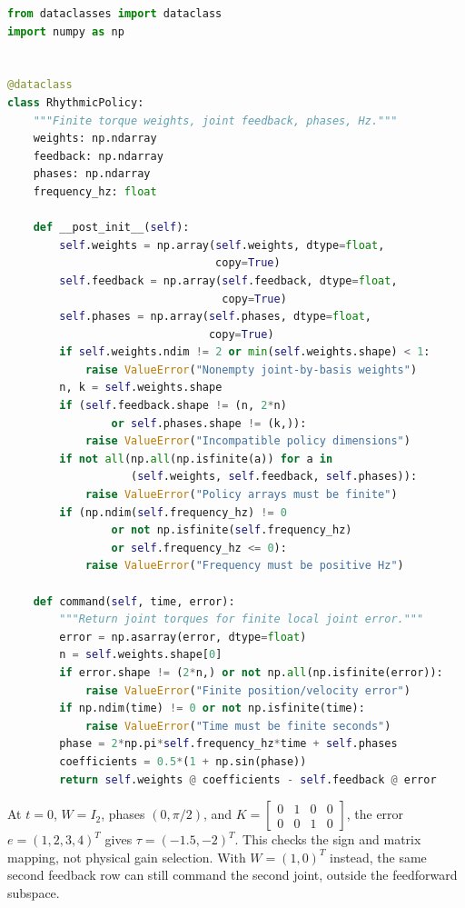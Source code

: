 \begin{lstlisting}[language=Python, caption={A Supplied Rhythmic Policy, Without a Plant}]
from dataclasses import dataclass
import numpy as np


@dataclass
class RhythmicPolicy:
    """Finite torque weights, joint feedback, phases, Hz."""
    weights: np.ndarray
    feedback: np.ndarray
    phases: np.ndarray
    frequency_hz: float

    def __post_init__(self):
        self.weights = np.array(self.weights, dtype=float,
                                copy=True)
        self.feedback = np.array(self.feedback, dtype=float,
                                 copy=True)
        self.phases = np.array(self.phases, dtype=float,
                               copy=True)
        if self.weights.ndim != 2 or min(self.weights.shape) < 1:
            raise ValueError("Nonempty joint-by-basis weights")
        n, k = self.weights.shape
        if (self.feedback.shape != (n, 2*n)
                or self.phases.shape != (k,)):
            raise ValueError("Incompatible policy dimensions")
        if not all(np.all(np.isfinite(a)) for a in
                   (self.weights, self.feedback, self.phases)):
            raise ValueError("Policy arrays must be finite")
        if (np.ndim(self.frequency_hz) != 0
                or not np.isfinite(self.frequency_hz)
                or self.frequency_hz <= 0):
            raise ValueError("Frequency must be positive Hz")

    def command(self, time, error):
        """Return joint torques for finite local joint error."""
        error = np.asarray(error, dtype=float)
        n = self.weights.shape[0]
        if error.shape != (2*n,) or not np.all(np.isfinite(error)):
            raise ValueError("Finite position/velocity error")
        if np.ndim(time) != 0 or not np.isfinite(time):
            raise ValueError("Time must be finite seconds")
        phase = 2*np.pi*self.frequency_hz*time + self.phases
        coefficients = 0.5*(1 + np.sin(phase))
        return self.weights @ coefficients - self.feedback @ error
\end{lstlisting}

At $t=0$, $W=I_2$, phases $(0,\pi/2)$, and
$K=\left[\begin{smallmatrix}0&1&0&0\\0&0&1&0\end{smallmatrix}\right]$,
the error $e=(1,2,3,4)^T$ gives $\tau=(-1.5,-2)^T$. This checks the sign and
matrix mapping, not physical gain selection. With $W=(1,0)^T$ instead, the
same second feedback row can still command the second joint, outside the
feedforward subspace.

